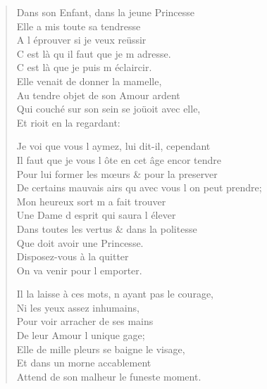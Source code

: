 \begin{verse}
\vin Dans son Enfant, dans la jeune Princesse \\
\vin Elle a mis toute sa tendresse \\
\vin A l\textquotesingle{} éprouver si je veux reüssir \\
\vin C\textquotesingle{} est là qu\textquotesingle{} il faut que je m\textquotesingle{} adresse. \\
\vin C\textquotesingle{} est là que je puis m\textquotesingle{} éclaircir. \\
\vin Elle venait de donner la mamelle, \\
\vin Au tendre objet de son Amour ardent \\
Qui couché sur son sein se joüoit avec elle, \\
\vin Et rioit en la regardant:

Je voi que vous l\textquotesingle{} aymez, lui dit-il, cependant \\
Il faut que je vous l\textquotesingle{} ôte en cet âge encor tendre \\
Pour lui former les mœurs \& pour la preserver \\
De certains mauvais airs qu\textquotesingle{} avec vous l\textquotesingle{} on peut prendre; \\
\vin Mon heureux sort m\textquotesingle{} a fait trouver \\
Une Dame d\textquotesingle{} esprit qui saura l\textquotesingle{} élever \\
Dans toutes les vertus \& dans la politesse \\
\vin Que doit avoir une Princesse. \\
\vin Disposez-vous à la quitter \\
\vin On va venir pour l\textquotesingle{} emporter.

Il la laisse à ces mots, n\textquotesingle{} ayant pas le courage, \\
\vin Ni les yeux assez inhumains, \\
\vin Pour voir arracher de ses mains \\
\vin De leur Amour l\textquotesingle{} unique gage; \\
Elle de mille pleurs se baigne le visage, \\
\vin Et dans un morne accablement \\
Attend de son malheur le funeste moment.


\end{verse}
